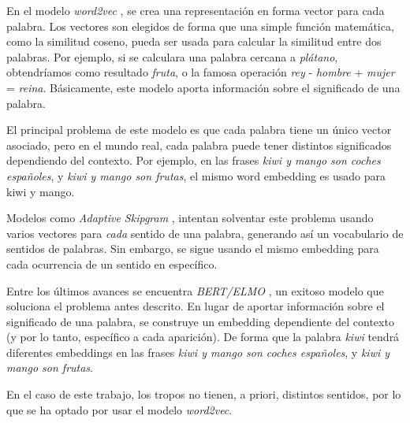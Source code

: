 En el modelo \emph{word2vec} \cite{word2vec:1} \cite{word2vec:2}, se crea una representación
en forma vector para cada palabra. Los vectores son elegidos de forma que una simple función
matemática, como la similitud coseno, pueda ser usada para calcular la similitud entre dos palabras.
Por ejemplo, si se calculara una palabra cercana a \emph{plátano}, obtendríamos como resultado
\emph{fruta}, o la famosa operación \emph{rey} - \emph{hombre} + \emph{mujer} = \emph{reina}.
Básicamente, este modelo aporta información sobre el significado de una palabra.

El principal problema de este modelo es que cada palabra tiene un único vector asociado,
pero en el mundo real, cada palabra puede tener distintos significados dependiendo del contexto.
Por ejemplo, en las frases \emph{kiwi y mango son coches españoles}, y \emph{kiwi y mango son frutas},
el mismo word embedding es usado para kiwi y mango.

Modelos como \emph{Adaptive Skipgram} \cite{adaptiveskipgram}, intentan solventar este problema usando
varios vectores para \emph{cada} sentido de una palabra, generando así un vocabulario de sentidos de palabras.
Sin embargo, se sigue usando el mismo embedding para cada ocurrencia de un sentido en específico.

Entre los últimos avances se encuentra \emph{BERT/ELMO} \cite{bert}, un exitoso modelo que soluciona el
problema antes descrito. En lugar de aportar información sobre el significado de una palabra, se construye
un embedding dependiente del contexto (y por lo tanto, específico a cada aparición). De forma que la palabra
\emph{kiwi} tendrá diferentes embeddings en las frases \emph{kiwi y mango son coches españoles}, y
\emph{kiwi y mango son frutas}.

En el caso de este trabajo, los tropos no tienen, a priori, distintos sentidos, por lo que se ha optado
por usar el modelo \emph{word2vec}.
